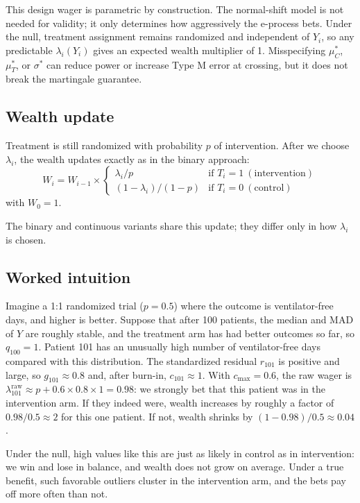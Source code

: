 \documentclass[10pt]{article}
\begin{document}
This design wager is parametric by construction. The normal-shift model is not needed for validity; it only determines how aggressively the e-process bets. Under the null, treatment assignment remains randomized and independent of $Y_i$, so any predictable $\lambda_i(Y_i)$ gives an expected wealth multiplier of 1. Misspecifying $\mu_C^\ast$, $\mu_T^\ast$, or $\sigma^\ast$ can reduce power or increase Type M error at crossing, but it does not break the martingale guarantee.

\subsection{Wealth update}

Treatment is still randomized with probability $p$ of intervention. After we choose $\lambda_i$, the wealth updates exactly as in the binary approach:
\begin{equation}
W_i = W_{i-1} \times
\begin{cases}
\lambda_i / p & \text{if } T_i = 1 \ (\text{intervention}) \\
(1 - \lambda_i) / (1-p) & \text{if } T_i = 0 \ (\text{control})
\end{cases}
\end{equation}
with $W_0 = 1$.

The binary and continuous variants share this update; they differ only in how $\lambda_i$ is chosen.

\subsection{Worked intuition}

Imagine a 1:1 randomized trial ($p=0.5$) where the outcome is ventilator-free days, and higher is better. Suppose that after 100 patients, the median and MAD of $Y$ are roughly stable, and the treatment arm has had better outcomes so far, so $q_{100}=1$. Patient 101 has an unusually high number of ventilator-free days compared with this distribution. The standardized residual $r_{101}$ is positive and large, so $g_{101} \approx 0.8$ and, after burn-in, $c_{101} \approx 1$. With $c_{\max} = 0.6$, the raw wager is $\lambda_{101}^{\mathrm{raw}} \approx p + 0.6 \times 0.8 \times 1 = 0.98$: we strongly bet that this patient was in the intervention arm. If they indeed were, wealth increases by roughly a factor of $0.98/0.5 \approx 2$ for this one patient. If not, wealth shrinks by $(1-0.98)/0.5 \approx 0.04$.

Under the null, high values like this are just as likely in control as in intervention: we win and lose in balance, and wealth does not grow on average. Under a true benefit, such favorable outliers cluster in the intervention arm, and the bets pay off more often than not.
\end{document}
